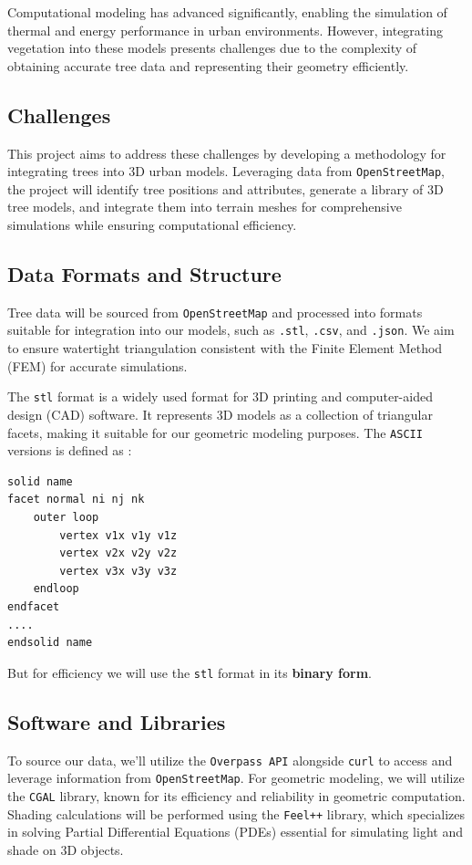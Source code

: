 \documentclass[12pt]{article}
\begin{document}
Computational modeling has advanced significantly, enabling the simulation of thermal 
and energy performance in urban environments. However, integrating vegetation into 
these models presents challenges due to the complexity of obtaining accurate tree data 
and representing their geometry efficiently\cite{AdTree}.

\newpage

\subsection{Challenges}
This project aims to address these challenges by developing a methodology for 
integrating trees into 3D urban models. Leveraging data from \texttt{OpenStreetMap},
the  project will identify tree positions and attributes, generate a library of 3D tree 
models, and integrate them into terrain meshes for comprehensive simulations while
ensuring computational efficiency.

\subsection{Data Formats and Structure}
Tree data will be sourced from \texttt{OpenStreetMap} and processed into formats suitable for 
integration into our models, such as \texttt{.stl}, \texttt{.csv}, and \texttt{.json}.
We aim to ensure watertight triangulation consistent with the Finite Element Method
(FEM) for accurate simulations.  

The \texttt{stl} format\cite{stl_format} is a widely used format for 3D printing and computer-aided design (CAD)
software. It represents 3D models as a collection of triangular facets, making it
suitable for our geometric modeling purposes.
The \texttt{ASCII} versions is defined as :
\begin{lstlisting}
solid name
facet normal ni nj nk
    outer loop
        vertex v1x v1y v1z
        vertex v2x v2y v2z
        vertex v3x v3y v3z
    endloop
endfacet
....
endsolid name
\end{lstlisting}
But for efficiency we will use the \texttt{stl} format in its \textbf{binary form}.
\subsection{Software and Libraries}
To source our data, we'll utilize the \texttt{Overpass API} \cite{overpass} alongside
\texttt{curl} \cite{curl} to access and leverage information from \texttt{OpenStreetMap}.
For geometric modeling, we will utilize the \texttt{CGAL} library, known for its efficiency and 
reliability in geometric computation\cite{cgal}. Shading calculations will be performed using the 
\texttt{Feel++} \cite{feel++} library, which specializes in solving Partial Differential Equations (PDEs) 
essential for simulating light and shade on 3D objects.
\end{document}
